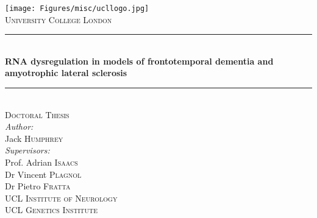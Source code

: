 
\begin{titlepage}%
\newcommand{\HRule}{\rule{\linewidth}{0.5mm}}

\center 

\texttt{[image: Figures/misc/ucllogo.jpg]}\\[1cm]
\textsc{\LARGE University College London}\\[2cm] %
\HRule \\[1cm]
{ \huge \bfseries RNA dysregulation in models of frontotemporal dementia and amyotrophic lateral sclerosis}\\[0.4cm] 
\HRule \\[2cm]


\textsc{\Large Doctoral Thesis}\\[1.5cm] %


\emph{Author:}\\
Jack \textsc{Humphrey}\\[1cm] %

\emph{Supervisors:} \\
Prof. Adrian \textsc{Isaacs}\\ 
Dr Vincent \textsc{Plagnol}\\ 
Dr Pietro \textsc{Fratta}\\[1cm]


\textsc{\Large UCL Institute of Neurology}\\[0.5cm] %
\textsc{\Large UCL Genetics Institute}\\[2cm] %




\vfill %

\end{titlepage}%
\cleardoublepage

